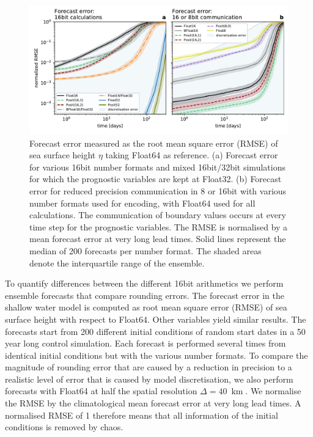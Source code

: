 \documentclass[draft]{agujournal2019}
\newcommand{\op}{\operatorname}
\begin{document}
\begin{figure}
\includegraphics[width=1\textwidth]{../plots/rmse_eta.pdf}
\caption{Forecast error measured as the root mean square error (RMSE) of sea surface height $\eta$ taking Float64 as reference. (a) Forecast error for various 16bit number formats and mixed 16bit/32bit simulations for which the prognostic variables are kept at Float32. (b) Forecast error for reduced precision communication in 8 or 16bit with various number formats used for encoding, with Float64 used for all calculations.  The communication of boundary values occurs at every time step for the prognostic variables. The RMSE is normalised by a mean forecast error at very long lead times. Solid lines represent the median of 200 forecasts per number format. The shaded areas denote the interquartile range of the ensemble.}
\label{fig:rmse}
\end{figure}

To quantify differences between the different 16bit arithmetics we perform ensemble forecasts that compare rounding errors. The forecast error in the shallow water model is computed as root mean square error (RMSE) of sea surface height with respect to Float64. Other variables yield similar results. The forecasts start from 200 different initial conditions of random start dates in a 50 year long control simulation. Each forecast is performed several times from identical initial conditions but with the various number formats. To compare the magnitude of rounding error that are caused by a reduction in precision to a realistic level of error that is caused by model discretisation, we also perform forecasts with Float64 at half the spatial resolution $\Delta = 40~\op{km}$. We normalise the RMSE by the climatological mean forecast error at very long lead times. A normalised RMSE of 1 therefore means that all information of the initial conditions is removed by chaos.
\end{document}
